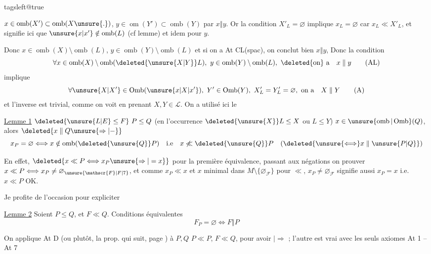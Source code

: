 \begingroup\csname tagsleft@true\endcsname

 $x\in\operatorname{omb}(X')\subset\operatorname{omb}(X\unsure{.})$, $y\in\operatorname{om}(Y')\subset\operatorname{omb}(Y)$ par $x\mathrel{\Vert}y$. Or la condition $X'_L=\varnothing$ implique $x_L=\varnothing$ car $x_L\ll X'_L$, et  signifie  ici que $\unsure{x|x'}\notin\operatorname{omb}(L)$ (cf lemme) et idem pour $y$.

Donc $x\in\operatorname{omb}(X)\setminus\operatorname{omb}(L)$, $y\in\operatorname{omb}(Y)\setminus\operatorname{omb}(L)$ et si on a At CL(spac), on conclut bien $x\mathrel{\Vert}y$,  Donc la condition
\[
 \forall x\in\operatorname{omb}(X)\setminus\operatorname{omb}(\deleted{\unsure{X|Y}}L),\
 y\in\operatorname{omb}(Y)\setminus\operatorname{omb}(L),\
 \text{\deleted{on} a}\quad x\mathrel{\Vert}y
 \tag*{(AL)}
\]
implique
\[
 \forall \unsure{X|X'}\in\operatorname{Omb}(\unsure{x|X|x'}),\
 Y'\in\operatorname{Omb}(Y),\ X'_L=Y'_L=\varnothing,\ \text{on a}\quad X\mathrel{\Vert}Y
 \tag*{(A)}
\]
et l'inverse est trivial, comme on voit en prenant $X,Y\in\mathcal{L}$. On a utilisé ici le

\uline{Lemme 1}  $\deleted{\unsure{L|E}\leq F}\ P\leq Q$ (en l'occurrence $\deleted{\unsure{X}}L\leq X$ ou $L\leq Y$) $x\in\unsure{\operatorname{omb}|\operatorname{Omb}}(Q)$, alors $\deleted{x\mathrel{\Vert}Q\unsure{\Rightarrow|-}}$
\[
 x_P=\varnothing\Longleftrightarrow x\notin\operatorname{omb}(\deleted{\unsure{Q}}P)\quad
 \text{i.e}\quad x\not\ll\deleted{\unsure{Q}}P\quad
 (\deleted{\unsure{\Longleftrightarrow}x\mathrel{\Vert}\unsure{P|Q}})
\]

En effet, $\deleted{x\ll P\Longleftrightarrow x_P\unsure{\Rightarrow|=x}}$ pour la première équivalence, passant aux négations on  prouver $x\ll P\Longleftrightarrow x_P\ne\varnothing_{\unsure{\mathscr{F}|F|7}}$, et comme $x_P\ll x$ et $x$ minimal dans $M\setminus\{\varnothing_{\mathscr{F}}\}$ pour $\ll$, $x_P\ne\varnothing_{\mathscr{F}}$ signifie aussi $x_P=x$ i.e. $x\ll P$ OK.

 Je profite de l'occasion pour expliciter

\noindent\vrule\hspace{.5em}\begin{minipage}{.94\linewidth}
\uline{Lemme 2} \inserted{(moyennant At D)} Soient $P\leq Q$, et $F\ll Q$. Conditions équivalentes
\[
 F_P=\varnothing\Longleftrightarrow F\mathrel{\Vert}P
\]
\end{minipage}

On applique At D (ou plutôt, la prop. qui suit,  page ) à $P,Q$ $P\ll P$, $F\ll Q$, pour avoir $|\Rightarrow$ ; l'autre est vrai avec les seuls axiomes At 1 -- At 7
\endgroup
